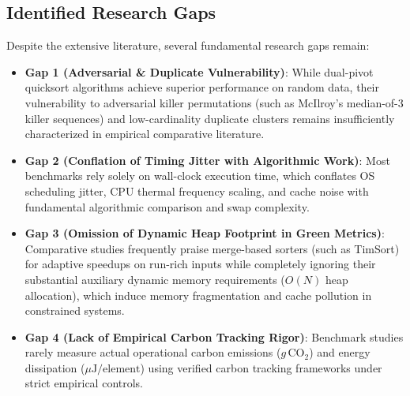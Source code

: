 \documentclass[journal]{IEEEtran}
\begin{document}
\subsection{Identified Research Gaps}
Despite the extensive literature, several fundamental research gaps remain:
\begin{itemize}
    \item \textbf{Gap 1 (Adversarial \& Duplicate Vulnerability)}: While dual-pivot quicksort algorithms achieve superior performance on random data, their vulnerability to adversarial killer permutations (such as McIlroy's median-of-3 killer sequences) and low-cardinality duplicate clusters remains insufficiently characterized in empirical comparative literature.
    \item \textbf{Gap 2 (Conflation of Timing Jitter with Algorithmic Work)}: Most benchmarks rely solely on wall-clock execution time, which conflates OS scheduling jitter, CPU thermal frequency scaling, and cache noise with fundamental algorithmic comparison and swap complexity.
    \item \textbf{Gap 3 (Omission of Dynamic Heap Footprint in Green Metrics)}: Comparative studies frequently praise merge-based sorters (such as TimSort) for adaptive speedups on run-rich inputs while completely ignoring their substantial auxiliary dynamic memory requirements ($O(N)$ heap allocation), which induce memory fragmentation and cache pollution in constrained systems.
    \item \textbf{Gap 4 (Lack of Empirical Carbon Tracking Rigor)}: Benchmark studies rarely measure actual operational carbon emissions ($g\,\text{CO}_2$) and energy dissipation ($\mu\text{J}/\text{element}$) using verified carbon tracking frameworks under strict empirical controls.
\end{itemize}
\end{document}
